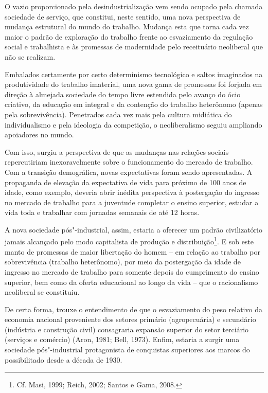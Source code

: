 O vazio proporcionado pela desindustrialização vem sendo ocupado pela
chamada sociedade de serviço, que constitui, neste sentido, uma nova
perspectiva de mudança estrutural do mundo do trabalho. Mudança esta que
torna cada vez maior o padrão de exploração do trabalho frente ao
esvaziamento da regulação social e trabalhista e às promessas de
modernidade pelo receituário neoliberal que não se realizam.

Embalados certamente por certo determinismo tecnológico e saltos
imaginados na produtividade do trabalho imaterial, uma nova gama de
promessas foi forjada em direção à almejada sociedade do tempo livre
estendida pelo avanço do ócio criativo, da educação em integral e da
contenção do trabalho heterônomo (apenas pela sobrevivência). Penetrados
cada vez mais pela cultura midiática do individualismo e pela ideologia
da competição, o neoliberalismo seguiu ampliando apoiadores no mundo.

Com isso, surgiu a perspectiva de que as mudanças nas relações sociais
repercutiriam inexoravelmente sobre o funcionamento do mercado de
trabalho. Com a transição demográfica, novas expectativas foram sendo
apresentadas. A propaganda de elevação da expectativa de vida para
próximo de 100 anos de idade, como exemplo, deveria abrir inédita
perspectiva à postergação do ingresso no mercado de trabalho para a
juventude completar o ensino superior, estudar a vida toda e trabalhar
com jornadas semanais de até 12 horas.

A nova sociedade pós"-industrial, assim, estaria a oferecer um padrão
civilizatório jamais alcançado pelo modo capitalista de produção e
distribuição\footnote{Cf. Masi, 1999; Reich, 2002; Santos e Gama, 2008.}. E sob este
manto de promessas de maior libertação do homem -- em relação ao trabalho por
sobrevivência (trabalho heterônomo), por meio da postergação da idade de
ingresso no mercado de trabalho para somente depois do cumprimento do
ensino superior, bem como da oferta educacional ao longo da vida -- que o
racionalismo neoliberal se constituiu.

De certa forma, trouxe o entendimento de que o esvaziamento do peso
relativo da economia nacional proveniente dos setores primário
(agropecuária) e secundário (indústria e construção civil) consagraria
expansão superior do setor terciário (serviços e comércio) (Aron, 1981;
Bell, 1973). Enfim, estaria a surgir uma sociedade pós"-industrial
protagonista de conquistas superiores aos marcos do possibilitado desde
a década de 1930.

